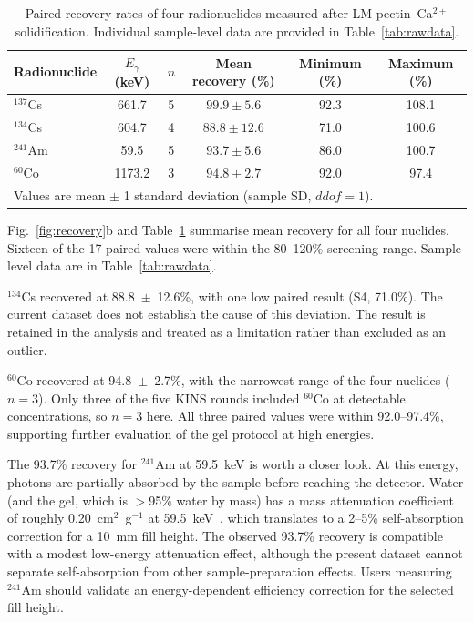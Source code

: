 \documentclass[preprint,12pt]{elsarticle}
\begin{document}
\begin{table}[htbp]
\caption{Paired recovery rates of four radionuclides
measured after LM-pectin--Ca$^{2+}$ solidification.
Individual sample-level data are provided in Table~\ref{tab:rawdata}.}
\label{tab:recovery}
\centering
\begin{tabular}{lccccc}
\toprule
Radionuclide & $E_\gamma$ (keV) & $n$ &
  Mean recovery (\%) & Minimum (\%) & Maximum (\%) \\
\midrule
$^{137}$Cs & 661.7   & 5 & $99.9 \pm 5.6$  & 92.3 & 108.1 \\
$^{134}$Cs & 604.7   & 4 & $88.8 \pm 12.6$ & 71.0 & 100.6 \\
$^{241}$Am & 59.5    & 5 & $93.7 \pm 5.6$  & 86.0 & 100.7 \\
$^{60}$Co  & 1173.2  & 3 & $94.8 \pm 2.7$  & 92.0 & 97.4 \\
\bottomrule
\multicolumn{6}{l}{\footnotesize Values are mean $\pm$ 1 standard deviation
  (sample SD, $ddof=1$).}
\end{tabular}
\end{table}

Fig.~\ref{fig:recovery}b and Table~\ref{tab:recovery} summarise
mean recovery for all four nuclides.
Sixteen of the 17 paired values were within the 80--120\% screening
range. Sample-level data are in Table~\ref{tab:rawdata}.

$^{134}$Cs recovered at 88.8~$\pm$~12.6\%, with one low paired result
(S4, 71.0\%). The current dataset does not establish the cause of this
deviation. The result is retained in the analysis and treated as a
limitation rather than excluded as an outlier.

$^{60}$Co recovered at 94.8~$\pm$~2.7\%, with the narrowest
range of the four nuclides ($n=3$).
Only three of the five KINS rounds included $^{60}$Co at detectable
concentrations, so $n=3$ here.
All three paired values were within 92.0--97.4\%, supporting further
evaluation of the gel protocol at high energies.

The 93.7\% recovery for $^{241}$Am at 59.5~keV is worth a closer look.
At this energy, photons are partially absorbed by the sample before
reaching the detector.
Water (and the gel, which is $>$95\% water by mass) has a mass
attenuation coefficient of roughly 0.20~cm$^2$~g$^{-1}$ at
59.5~keV~\cite{Hubbell2004}, which translates to a 2--5\%
self-absorption correction for a 10~mm fill height.
The observed 93.7\% recovery is compatible with a modest low-energy
attenuation effect, although the present dataset cannot separate
self-absorption from other sample-preparation effects.
Users measuring $^{241}$Am should validate an energy-dependent efficiency
correction for the selected fill height.
\end{document}
